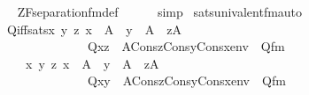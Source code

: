 \begin{isabellebody}
\ \ \ \ \isamarkupfalse%
\ ZF{\isacharunderscore}{\kern0pt}separation{\isacharunderscore}{\kern0pt}fm{\isacharunderscore}{\kern0pt}def\isanewline
\ \ \ \ \isamarkupfalse%
\ simp\isanewline
{}\isamarkupfalse%
%
\endisatagproof
{\isafoldproof}%
%
\isadelimproof
%
\endisadelimproof
%
\isadelimdocument
%
\endisadelimdocument
%
\isatagdocument
%
\isamarkuptrue%
%
\endisatagdocument
{\isafolddocument}%
%
\isadelimdocument
%
\endisadelimdocument
{}\isamarkupfalse%
\ sats{\isacharunderscore}{\kern0pt}univalent{\isacharunderscore}{\kern0pt}fm{\isacharunderscore}{\kern0pt}auto{\isacharcolon}{\kern0pt}\isanewline
\ \ \ \isanewline
\ \ \ \ \isanewline
\ \ \ \ Q{\isacharunderscore}{\kern0pt}iff{\isacharunderscore}{\kern0pt}sats{\isacharcolon}{\kern0pt}{\isachardoublequoteopen}{\isasymAnd}x\ y\ z{\isachardot}{\kern0pt}\ x\ {\isasymin}\ A\ {\isasymLongrightarrow}\ y\ {\isasymin}\ A\ {\isasymLongrightarrow}\ z{\isasymin}A\ {\isasymLongrightarrow}\ \isanewline
\ \ \ \ \ \ \ \ \ \ \ \ \ \ \ \ \ Q{\isacharparenleft}{\kern0pt}x{\isacharcomma}{\kern0pt}z{\isacharparenright}{\kern0pt}\ {\isasymlongleftrightarrow}\ {\isacharparenleft}{\kern0pt}A{\isacharcomma}{\kern0pt}Cons{\isacharparenleft}{\kern0pt}z{\isacharcomma}{\kern0pt}Cons{\isacharparenleft}{\kern0pt}y{\isacharcomma}{\kern0pt}Cons{\isacharparenleft}{\kern0pt}x{\isacharcomma}{\kern0pt}env{\isacharparenright}{\kern0pt}{\isacharparenright}{\kern0pt}{\isacharparenright}{\kern0pt}\ {\isasymTurnstile}\ Q{}{\isacharunderscore}{\kern0pt}fm{\isacharparenright}{\kern0pt}{\isachardoublequoteclose}\isanewline
\ \ \ \ \ \ \ {\isachardoublequoteopen}{\isasymAnd}x\ y\ z{\isachardot}{\kern0pt}\ x\ {\isasymin}\ A\ {\isasymLongrightarrow}\ y\ {\isasymin}\ A\ {\isasymLongrightarrow}\ z{\isasymin}A\ {\isasymLongrightarrow}\ \isanewline
\ \ \ \ \ \ \ \ \ \ \ \ \ \ \ \ \ Q{\isacharparenleft}{\kern0pt}x{\isacharcomma}{\kern0pt}y{\isacharparenright}{\kern0pt}\ {\isasymlongleftrightarrow}\ {\isacharparenleft}{\kern0pt}A{\isacharcomma}{\kern0pt}Cons{\isacharparenleft}{\kern0pt}z{\isacharcomma}{\kern0pt}Cons{\isacharparenleft}{\kern0pt}y{\isacharcomma}{\kern0pt}Cons{\isacharparenleft}{\kern0pt}x{\isacharcomma}{\kern0pt}env{\isacharparenright}{\kern0pt}{\isacharparenright}{\kern0pt}{\isacharparenright}{\kern0pt}\ {\isasymTurnstile}\ Q{}{\isacharunderscore}{\kern0pt}fm{\isacharparenright}{\kern0pt}{\isachardoublequoteclose}\isanewline
\ \ \ \ \ \isanewline

\end{isabellebody}
